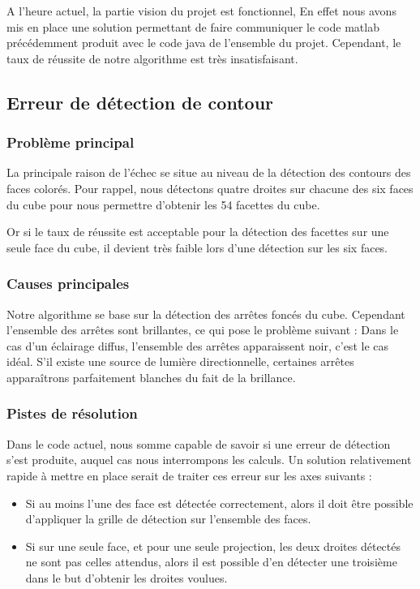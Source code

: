   A l'heure actuel, la partie vision du projet est fonctionnel, En effet nous avons mis en place une solution permettant de faire communiquer le code matlab précédemment produit avec le code java de l'ensemble du projet.
  Cependant, le taux de réussite de notre algorithme est très insatisfaisant. 

\subsection{Erreur de détection de contour}

\subsubsection{Problème principal}

	La principale raison de l'échec se situe au niveau de la détection des contours des faces colorés. Pour rappel, nous détectons quatre droites sur chacune des six faces du cube pour nous permettre d'obtenir les 54 facettes du cube.

	Or si le taux de réussite est acceptable pour la détection des facettes sur une seule face du cube, il devient très faible lors d'une détection sur les six faces.
	
\subsubsection{Causes principales}
	
	Notre algorithme se base sur la détection des arrêtes foncés du cube. Cependant l'ensemble des arrêtes sont brillantes, ce qui pose le problème suivant :
	Dans le cas d'un éclairage diffus, l'ensemble des arrêtes apparaissent noir, c'est le cas idéal. S'il existe une source de lumière directionnelle, certaines arrêtes apparaîtrons parfaitement blanches du fait de la brillance.
	
\subsubsection{Pistes de résolution}

	Dans le code actuel, nous somme capable de savoir si une erreur de détection s'est produite, auquel cas nous interrompons les calculs. Un solution relativement rapide à mettre en place serait de traiter ces erreur sur les axes suivants :
	\begin{itemize}
	\item Si au moins l'une des face est détectée correctement, alors il doit être possible d'appliquer la grille de détection sur l'ensemble des faces.
	\item Si sur une seule face, et pour une seule projection, les deux droites détectés ne sont pas celles attendus, alors il est possible d'en détecter une troisième dans le but d'obtenir les droites voulues.
	\end{itemize}	
	
